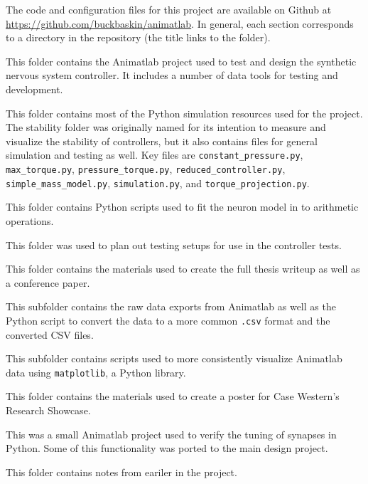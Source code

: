 The code and configuration files for this project are available on Github at \url{https://github.com/buckbaskin/animatlab}. In general, each section corresponds to a directory in the repository (the title links to the folder).


This folder contains the Animatlab project used to test and design the synthetic nervous system controller. It includes a number of data tools for testing and development.


This folder contains most of the Python simulation resources used for the project. The stability folder was originally named for its intention to measure and visualize the stability of controllers, but it also contains files for general simulation and testing as well. Key files are \texttt{constant\_pressure.py}, \texttt{max\_torque.py}, \texttt{pressure\_torque.py}, \texttt{reduced\_controller.py}, \texttt{simple\_mass\_model.py}, \texttt{simulation.py}, and \texttt{torque\_projection.py}.


This folder contains Python scripts used to fit the neuron model in \cite{NickFunctionalSubnetwork} to arithmetic operations.


This folder was used to plan out testing setups for use in the controller tests.


This folder contains the materials used to create the full thesis writeup as well as a conference paper.


This subfolder contains the raw data exports from Animatlab as well as the Python script to convert the data to a more common \texttt{.csv} format and the converted CSV files.


This subfolder contains scripts used to more consistently visualize Animatlab data using \texttt{matplotlib}, a Python library.


This folder contains the materials used to create a poster for Case Western's Research Showcase.


This was a small Animatlab project used to verify the tuning of synapses in Python. Some of this functionality was ported to the main design project.


This folder contains notes from eariler in the project.